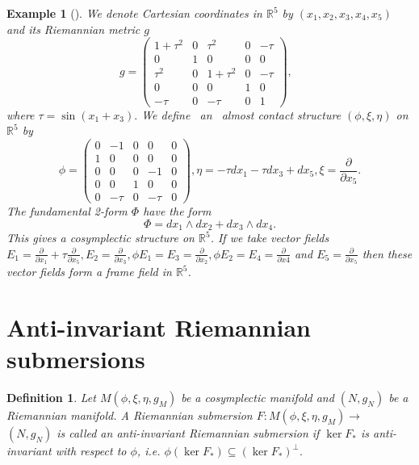 \documentclass{amsart}
\theoremstyle{plain}
\newtheorem{definition}{Definition}
\newtheorem{example}{Example}
\numberwithin{equation}{section}
\begin{document}
\begin{example}[\protect\cite{KIM}]
We denote Cartesian coordinates in $\mathbb{R}
^{5}$ by $(x_{1},x_{2},x_{3},x_{4},x_{5})$ and its Riemannian metric $g$ 
\begin{equation*}
g=\left( 
\begin{array}{ccccc}
1+\tau ^{2} & 0 & \tau ^{2} & 0 & -\tau \\ 
0 & 1 & 0 & 0 & 0 \\ 
\tau ^{2} & 0 & 1+\tau ^{2} & 0 & -\tau \\ 
0 & 0 & 0 & 1 & 0 \\ 
-\tau & 0 & -\tau & 0 & 1\end{array}\right) ,\text{ \ }
\end{equation*}where $\tau =\sin (x_{1}+x_{3}).$ We define \ an \ almost contact structure $(\phi ,\xi ,\eta )$ on $\mathbb{R}
^{5}$ by 
\begin{equation*}
\phi =\left( 
\begin{array}{ccccc}
0 & -1 & 0 & 0 & 0 \\ 
1 & 0 & 0 & 0 & 0 \\ 
0 & 0 & 0 & -1 & 0 \\ 
0 & 0 & 1 & 0 & 0 \\ 
0 & -\tau & 0 & -\tau & 0\end{array}\right) ,\eta =-\tau dx_{1}-\tau dx_{3}+dx_{5},\xi =\frac{\partial }{\partial x_{5}}.
\end{equation*}The fundamental 2-form $\Phi $ have the form 
\begin{equation*}
\Phi =dx_{1}\wedge dx_{2}+dx_{3}\wedge dx_{4}.
\end{equation*}This gives a cosymplectic structure on $\mathbb{R}
^{5}$. If we take vector fields $E_{1}=\frac{\partial }{\partial x_{1}}+\tau 
\frac{\partial }{\partial x_{5}},E_{2}=\frac{\partial }{\partial x_{3}},\phi
E_{1}=E_{3}=\frac{\partial }{\partial x_{2}},\phi E_{2}=E_{4}=\frac{\partial 
}{\partial x4}$ and $E_{5}=\frac{\partial }{\partial x_{5}}$ then these
vector fields form a frame field in $\mathbb{R}
^{5}$.
\end{example}

\section{\textbf{Anti-invariant Riemannian submersions}}

\begin{definition}
Let $M(\phi ,\xi ,\eta ,g_{M})$ be a cosymplectic manifold and $(N,g_{N})$
be a Riemannian manifold. A Riemannian submersion $F:M(\phi ,\xi ,\eta
,g_{M})\rightarrow $ $(N,g_{N})$ is called an anti-invariant Riemannian
submersion if $\ker F_{\ast }$ is anti-invariant with respect to $\phi $,
i.e. $\phi (\ker F_{\ast })\subseteq (\ker F_{\ast })^{\bot }.$
\end{definition}
\end{document}
